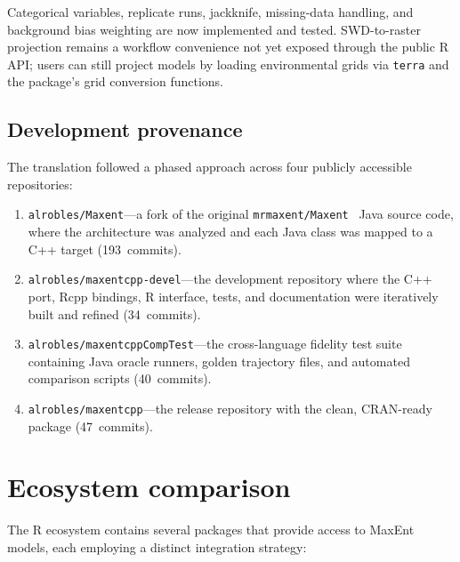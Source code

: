 \documentclass[10pt,letterpaper]{article}
\begin{document}
Categorical variables, replicate runs, jackknife, missing-data handling,
and background bias weighting are now implemented and tested.
SWD-to-raster projection remains a workflow convenience not yet exposed
through the public R API; users can still project models by loading
environmental grids via \texttt{terra} and the package's grid conversion
functions.

\subsection*{Development provenance}

The translation followed a phased approach across four publicly
accessible repositories:

\begin{enumerate}[leftmargin=*,nosep]
  \item \texttt{alrobles/Maxent}---a fork of the original
    \texttt{mrmaxent/Maxent}~\cite{Phillips2017} Java source code,
    where the architecture was analyzed and each Java class was mapped to
    a C++ target (193~commits).
  \item \texttt{alrobles/maxentcpp-devel}---the development repository
    where the C++ port, Rcpp bindings, R interface, tests, and
    documentation were iteratively built and refined (34~commits).
  \item \texttt{alrobles/maxentcppCompTest}---the cross-language fidelity
    test suite containing Java oracle runners, golden trajectory files,
    and automated comparison scripts (40~commits).
  \item \texttt{alrobles/maxentcpp}---the release repository with the
    clean, CRAN-ready package (47~commits).
\end{enumerate}

\section*{Ecosystem comparison}

The R ecosystem contains several packages that provide access to MaxEnt
models, each employing a distinct integration strategy:
\end{document}
